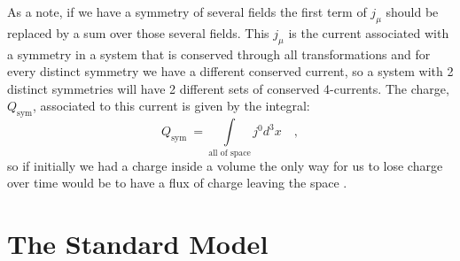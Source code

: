 \documentclass[12pt]{article}
\begin{document}
%
As a note, if we have a symmetry of several fields the first term of $j_\mu$ should be replaced by a sum over those several fields. This $j_\mu$ is the current associated with a symmetry in a system that is conserved through all transformations and for every distinct symmetry we have a different conserved current, so a system with 2 distinct symmetries will have 2 different sets of conserved 4-currents. The charge, $Q_{\text{sym}}$, associated to this current is given by the integral: 
%
\begin{equation}
Q_{\text{sym}} \ = \underset{\text{all \ of \ space}}{\int} j^0 d^3 x \quad ,
\end{equation}
%
so if initially we had a charge inside a volume the only way for us to lose charge over time would be to have a flux of charge leaving the space %
\cite{costa2012symmetries}.

\section{The Standard Model}
\end{document}
